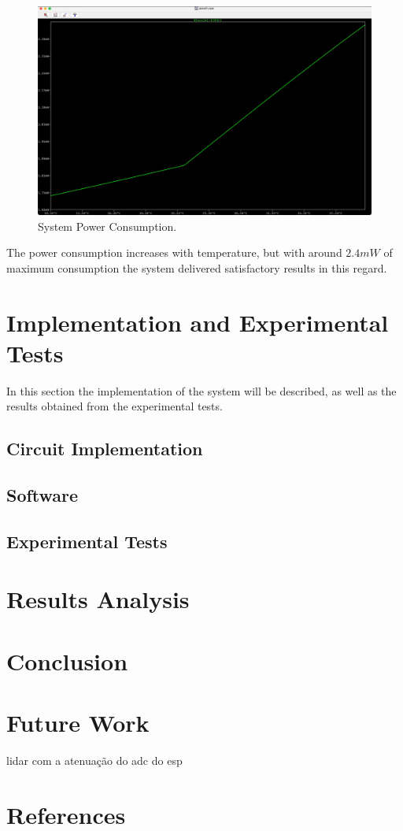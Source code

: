 \documentclass[12pt]{article}
\begin{document}
    \begin{figure}[H] 
        \centering
        \includegraphics*[scale = 0.15]{images/PowerConsumption.jpeg}
        \caption{System Power Consumption.}
        \label{wrap-fig:1}
    \end{figure}

    The power consumption increases with temperature, but with around $2.4 mW$ of maximum consumption the system delivered satisfactory results in this regard.  
    
\section{Implementation and Experimental Tests}

In this section the implementation of the system will be described, as well as the results obtained from the experimental tests.

\subsection{Circuit Implementation}

\subsection{Software}

\subsection{Experimental Tests}

\section{Results Analysis}

\section{Conclusion}

\section{Future Work}
lidar com a atenuação do adc do esp

\section{References}

\end{document}
